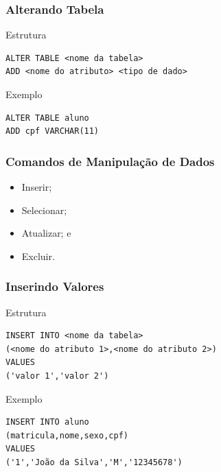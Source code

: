 \documentclass{beamer}
\begin{document}
\begin{frame}[fragile]
\frametitle{Alterando Tabela}

\begin{block}{Estrutura}
\begin{lstlisting}
ALTER TABLE <nome da tabela> 
ADD <nome do atributo> <tipo de dado>
\end{lstlisting}
\end{block}\vfill

\begin{exampleblock}{Exemplo}
\begin{lstlisting}
ALTER TABLE aluno
ADD cpf VARCHAR(11)
\end{lstlisting}
\end{exampleblock}
\end{frame}

\begin{frame}
\frametitle{Comandos de Manipulação de Dados}

\begin{itemize}
	\item Inserir;
	\item Selecionar;
	\item Atualizar; e
	\item Excluir.
\end{itemize}
\end{frame}

\begin{frame}[fragile]
\frametitle{Inserindo Valores}

\begin{block}{Estrutura}
\begin{lstlisting}
INSERT INTO <nome da tabela>
(<nome do atributo 1>,<nome do atributo 2>)
VALUES
('valor 1','valor 2')
\end{lstlisting}
\end{block}\vfill

\begin{exampleblock}{Exemplo}
\begin{lstlisting}
INSERT INTO aluno
(matricula,nome,sexo,cpf)
VALUES
('1','João da Silva','M','12345678')
\end{lstlisting}
\end{exampleblock}
\end{frame}
\end{document}
